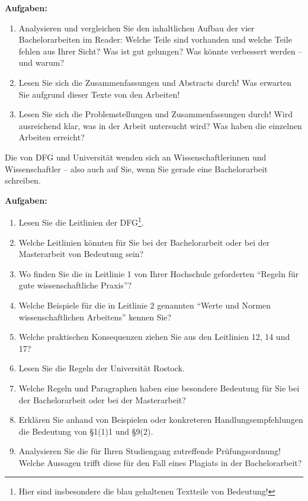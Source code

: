 \documentclass[a4paper]{article}%
\begin{document}
\textbf{Aufgaben:}
\begin{enumerate}
\item Analysieren und vergleichen Sie den inhaltlichen Aufbau der vier Bachelorarbeiten im Reader:
Welche Teile sind vorhanden und welche Teile fehlen aus Ihrer Sicht? Was ist gut gelungen? Was könnte verbessert werden -- und warum?
\item Lesen Sie sich die Zusammenfassungen und Abstracts durch! Was erwarten Sie aufgrund
dieser Texte von den Arbeiten!
\item Lesen Sie sich die Problemstellungen und Zusammenfassungen durch! 
Wird ausreichend klar, was in der Arbeit untersucht wird?
Was haben die einzelnen Arbeiten erreicht?
\end{enumerate}








Die  von DFG und Universität wenden sich an Wissenschaftlerinnen
und Wissenschaftler -- also auch auf Sie, wenn Sie gerade eine Bachelorarbeit schreiben.



\textbf{Aufgaben:}
\begin{enumerate}
\item Lesen Sie die Leitlinien der DFG\footnote{Hier sind insbesondere die blau gehaltenen Textteile von 
Bedeutung!}.
\item Welche Leitlinien könnten für Sie bei der Bachelorarbeit oder bei der
Masterarbeit von Bedeutung sein?
\item Wo finden Sie die in Leitlinie 1 von Ihrer Hochschule geforderten 
\enquote{Regeln für gute wissenschaftliche Praxis}?
\item Welche Beispiele für die in Leitlinie 2
genannten \enquote{Werte und Normen wissenschaftlichen Arbeitens} kennen Sie?
\item Welche praktischen Konsequenzen ziehen Sie aus den Leitlinien 12, 14 und 17?
\item Lesen Sie die Regeln der Universität Rostock.
\item Welche Regeln und Paragraphen haben eine besondere Bedeutung 
für Sie bei der Bachelorarbeit oder bei der
Masterarbeit?
\item Erklären Sie anhand von Beispielen oder konkreteren Handlungsempfehlungen die
Bedeutung von \S1(1)1 und \S9(2).

\item Analysieren Sie die für Ihren Studiengang zutreffende Prüfungsordnung!
Welche Aussagen trifft diese für den Fall eines Plagiats in der
Bachelorarbeit?
\end{enumerate}
\end{document}
